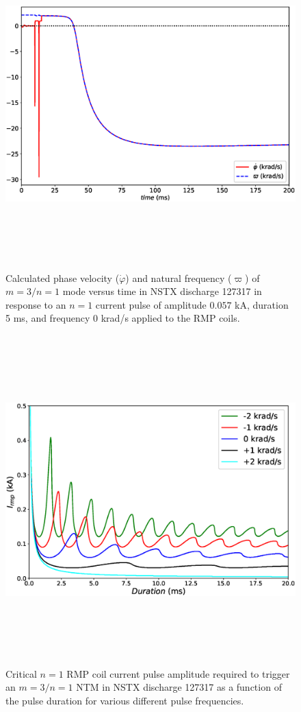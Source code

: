 \documentclass[12pt,prb,aps]{revtex4-1}
\begin{document}
\begin{figure}
\centerline{\includegraphics[height=5in]{Fig5a.eps}}
\caption{Calculated phase velocity ($\dot{\varphi}$) and natural frequency ($\varpi$) of $m=3/n=1$ mode versus time in NSTX discharge 127317 in response to an $n=1$ current pulse of amplitude $0.057$ kA, duration 5 ms, and frequency 0 krad/s applied to the RMP coils.}\label{fig5a}
\end{figure}

\begin{figure}
\centerline{\includegraphics[height=5in]{Fig6.eps}}
\caption{Critical $n=1$ RMP coil current pulse amplitude required to trigger an $m=3/n=1$ NTM in NSTX discharge 127317 
as a function of the pulse duration  for various different pulse frequencies.}\label{fig6}
\end{figure}
\end{document}

